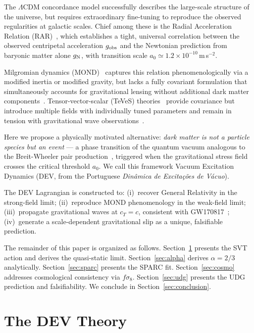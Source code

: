 \documentclass[aps,prd,twocolumn,showpacs,superscriptaddress]{revtex4-2}
\newcommand{\aO}{a_0}
\newcommand{\gN}{g_{\rm N}}
\newcommand{\gobs}{g_{\rm obs}}
\newcommand{\LCDM}{$\Lambda$CDM}
\begin{document}
The \LCDM{} concordance model successfully describes the large-scale
structure of the universe, but requires extraordinary fine-tuning to
reproduce the observed regularities at galactic scales.
Chief among these is the Radial Acceleration Relation
(RAR)~\cite{McGaugh2016}, which establishes a tight, universal
correlation between the observed centripetal acceleration $\gobs$ and
the Newtonian prediction from baryonic matter alone $\gN$,
with transition scale $\aO \simeq 1.2\times10^{-10}$\,m\,s$^{-2}$.

Milgromian dynamics (MOND)~\cite{Milgrom1983} captures this relation
phenomenologically via a modified inertia or modified gravity, but
lacks a fully covariant formulation that simultaneously accounts for
gravitational lensing without additional dark matter
components~\cite{Clowe2006}.
Tensor-vector-scalar (TeVeS) theories~\cite{Bekenstein2004}
provide covariance but introduce multiple fields with individually
tuned parameters and remain in tension with gravitational wave
observations~\cite{GW170817}.

Here we propose a physically motivated alternative:
\emph{dark matter is not a particle species but an event} —
a phase transition of the quantum vacuum analogous to the
Breit-Wheeler pair production~\cite{BreitWheeler1934},
triggered when the gravitational stress field crosses the
critical threshold $\aO$.
We call this framework Vacuum Excitation Dynamics (DEV,
from the Portuguese \emph{Din\^amica de Excita\c{c}\~oes de V\'acuo}).

The DEV Lagrangian is constructed to:
(i)~recover General Relativity in the strong-field limit;
(ii)~reproduce MOND phenomenology in the weak-field limit;
(iii)~propagate gravitational waves at $c_T = c$, consistent with
     GW170817~\cite{GW170817};
(iv)~generate a scale-dependent gravitational slip as a
     unique, falsifiable prediction.

The remainder of this paper is organized as follows.
Section~\ref{sec:theory} presents the SVT action and derives the
quasi-static limit.
Section~\ref{sec:alpha} derives $\alpha = 2/3$ analytically.
Section~\ref{sec:sparc} presents the SPARC fit.
Section~\ref{sec:cosmo} addresses cosmological consistency via $f\sigma_8$.
Section~\ref{sec:udg} presents the UDG prediction and falsifiability.
We conclude in Section~\ref{sec:conclusion}.

\section{The DEV Theory}
\label{sec:theory}
\end{document}
